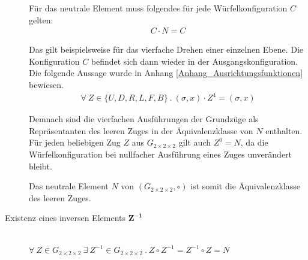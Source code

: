 \documentclass[12pt,a4paper, usenames, dvipsnames]{article}
\theoremstyle{mystyle}
\theoremstyle{definition}
\newcommand{\Gtwo}{\ensuremath{G_{2\times 2\times 2}}}
\begin{document}
\begin{description}
Für das neutrale Element muss folgendes für jede Würfelkonfiguration $C$ gelten:
\begin{align*}
C \cdot N = C
\end{align*}

Das gilt beispielsweise für das vierfache Drehen einer einzelnen Ebene. Die Konfiguration $C$ befindet sich dann wieder in der Ausgangskonfiguration. Die folgende Aussage wurde in Anhang \ref{Anhang_Ausrichtungsfunktionen} bewiesen.
\begin{align*}
\forall \ Z \in \{U, D, R, L, F, B\} \ . \ (\sigma, x) \cdot Z^4 = (\sigma, x)
\end{align*}

Demnach sind die vierfachen Ausführungen der Grundzüge als Repräsentanten des leeren Zuges in der Äquivalenzklasse von $N$ enthalten.
Für jeden beliebigen Zug $Z$ aus $\Gtwo$ gilt auch $Z^0=N$, da die Würfelkonfiguration bei nullfacher Ausführung eines Zuges unverändert bleibt.

Das neutrale Element $N$ von $(\Gtwo, \circ)$ ist somit die Äquivalenzklasse des leeren Zuges.


\item [Existenz eines inversen Elements $\boldsymbol{Z^{-1}}$] \ \\
$\forall \  Z \in \Gtwo \ \exists \  Z^{-1} \in \Gtwo \ .  \ Z \circ Z^{-1} = Z^{-1} \circ Z = N$  



\end{description}
\end{document}
